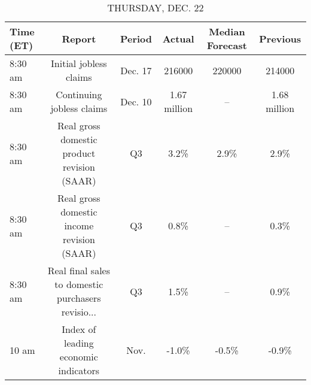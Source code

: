 \documentclass{article}%
\begin{document}
%


\begin{table}[htbp]%
\caption{THURSDAY, DEC. 22}%
\centering%
\begin{adjustbox}{width=1\textwidth}%
\begin{tabular}{lccccc}
\toprule
Time (ET) &                                             Report &  Period &       Actual & Median Forecast &     Previous \\
\midrule
  8:30 am &                             Initial jobless claims & Dec. 17 &       216000 &          220000 &       214000 \\
  8:30 am &                          Continuing jobless claims & Dec. 10 & 1.67 million &              -- & 1.68 million \\
  8:30 am &        Real gross domestic product revision (SAAR) &      Q3 &         3.2\% &            2.9\% &         2.9\% \\
  8:30 am &         Real gross domestic income revision (SAAR) &      Q3 &         0.8\% &              -- &         0.3\% \\
  8:30 am & Real final sales to domestic purchasers revisio... &      Q3 &         1.5\% &              -- &         0.9\% \\
    10 am &               Index of leading economic indicators &    Nov. &        -1.0\% &           -0.5\% &        -0.9\% \\
\bottomrule
\end{tabular}
%
\end{adjustbox}%
\end{table}

%
\end{document}
